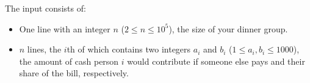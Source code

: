 
    The input consists of:
    \begin{itemize}
        \item One line with an integer $n$ ($2 \leq n \leq 10^5$), the size of your dinner group.
        \item $n$ lines, the $i$th of which contains two integers $a_i$ and $b_i$ ($1 \leq a_i, b_i \leq 1000$), the amount of cash person $i$ would contribute if someone else pays and their share of the bill, respectively.
    \end{itemize}
